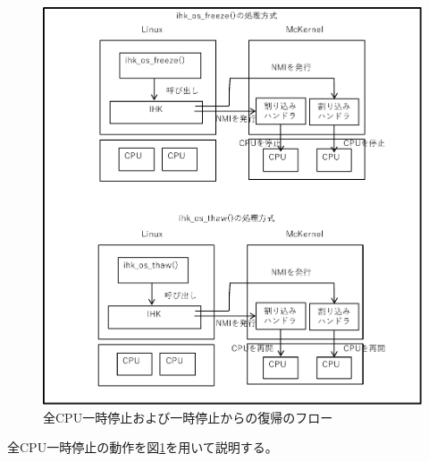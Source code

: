 \documentclass[twoside,11pt,fleqn]{book}
\begin{document}
\begin{figure}[!ht]
  \includegraphics[scale=0.7,bb=0 0 720 540]{figs/freezer_flow.pdf}
  \caption{全CPU一時停止および一時停止からの復帰のフロー}
  \label{figure:chap02_fig002}
\end{figure}
\FloatBarrier
%
全CPU一時停止の動作を図\ref{figure:chap02_fig002}を用いて説明する。
\end{document}
